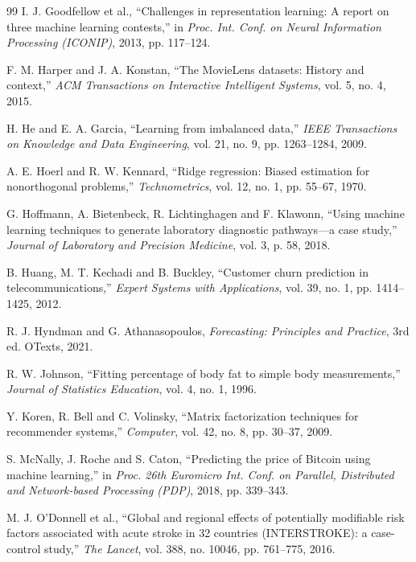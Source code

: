 \documentclass[11pt,letterpaper]{article}
\begin{document}
\begin{thebibliography}{99}
 I. J. Goodfellow et al., ``Challenges in representation learning: A report on three machine learning contests,'' in \emph{Proc. Int. Conf. on Neural Information Processing (ICONIP)}, 2013, pp. 117--124.

 F. M. Harper and J. A. Konstan, ``The MovieLens datasets: History and context,'' \emph{ACM Transactions on Interactive Intelligent Systems}, vol. 5, no. 4, 2015.

 H. He and E. A. Garcia, ``Learning from imbalanced data,'' \emph{IEEE Transactions on Knowledge and Data Engineering}, vol. 21, no. 9, pp. 1263--1284, 2009.

 A. E. Hoerl and R. W. Kennard, ``Ridge regression: Biased estimation for nonorthogonal problems,'' \emph{Technometrics}, vol. 12, no. 1, pp. 55--67, 1970.

 G. Hoffmann, A. Bietenbeck, R. Lichtinghagen and F. Klawonn, ``Using machine learning techniques to generate laboratory diagnostic pathways---a case study,'' \emph{Journal of Laboratory and Precision Medicine}, vol. 3, p. 58, 2018.

 B. Huang, M. T. Kechadi and B. Buckley, ``Customer churn prediction in telecommunications,'' \emph{Expert Systems with Applications}, vol. 39, no. 1, pp. 1414--1425, 2012.

 R. J. Hyndman and G. Athanasopoulos, \emph{Forecasting: Principles and Practice}, 3rd ed. OTexts, 2021.

 R. W. Johnson, ``Fitting percentage of body fat to simple body measurements,'' \emph{Journal of Statistics Education}, vol. 4, no. 1, 1996.

 Y. Koren, R. Bell and C. Volinsky, ``Matrix factorization techniques for recommender systems,'' \emph{Computer}, vol. 42, no. 8, pp. 30--37, 2009.

 S. McNally, J. Roche and S. Caton, ``Predicting the price of Bitcoin using machine learning,'' in \emph{Proc. 26th Euromicro Int. Conf. on Parallel, Distributed and Network-based Processing (PDP)}, 2018, pp. 339--343.

 M. J. O'Donnell et al., ``Global and regional effects of potentially modifiable risk factors associated with acute stroke in 32 countries (INTERSTROKE): a case-control study,'' \emph{The Lancet}, vol. 388, no. 10046, pp. 761--775, 2016.


\end{thebibliography}
\end{document}
